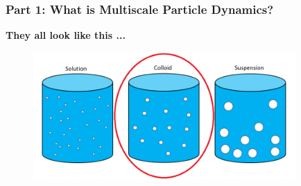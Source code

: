 \documentclass[aspectratio=169,xcolor=dvipsnames]{beamer}
\begin{document}
\begin{frame}
\begin{columns}
	\end{columns}
\end{frame}

\begin{frame}
	\frametitle{Part 1: What is Multiscale Particle Dynamics?}
	\textbf{They all look like this ...}
	\begin{figure}
		\includegraphics[width=10cm]{Particles2.png}
	\end{figure}

\end{frame}
\end{document}
